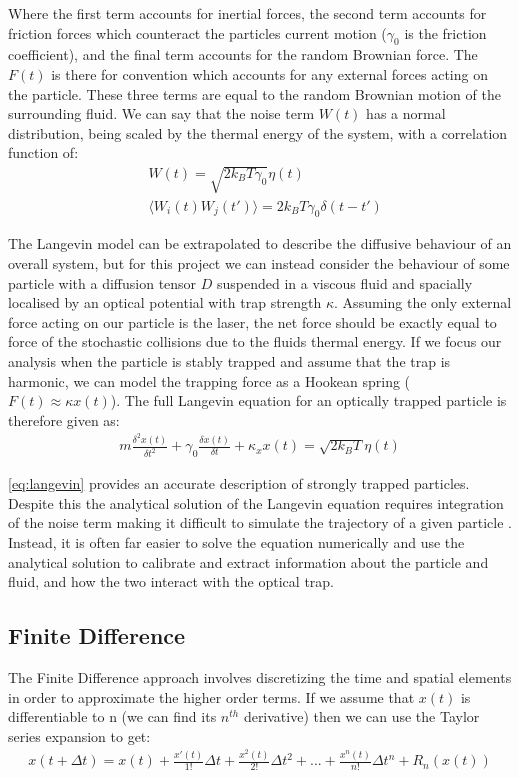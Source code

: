 Where the first term accounts for inertial forces, the second term 
accounts for friction forces which counteract the particles current 
motion ($\gamma_0$ is the friction coefficient), and the final term 
accounts for the random Brownian force. The $F(t)$ is there for 
convention which accounts for any external forces acting on the 
particle. These three terms are equal to the random Brownian motion 
of the surrounding fluid. We can say that the noise term $W(t)$ has 
a normal distribution, being scaled by the thermal energy of the 
system, with a correlation function of:
\begin{align}
	&W(t) = \sqrt{2k_BT\gamma_0}\eta(t) \\
	&\langle W_i(t)W_j(t')\rangle = 2k_BT\gamma_0\delta(t-t')
\end{align}

The Langevin model can be extrapolated to describe the diffusive behaviour 
of an overall system, but for this project we can instead consider the 
behaviour of some particle with a diffusion tensor $D$ suspended in a 
viscous fluid and spacially localised by an optical potential with trap 
strength $\kappa$. Assuming the only external force acting on our particle 
is the laser, the net force should be exactly equal to force of the stochastic
collisions due to the fluids thermal energy. If we focus our analysis when 
the particle is stably trapped and assume that the trap is harmonic, we can 
model the trapping force as a Hookean spring ($F(t) \approx \kappa x(t)$). 
The full Langevin equation for an optically trapped particle is therefore given as:
\begin{align}
	\label{eq:langevin}
	m\frac{\delta^2x(t)}{\delta t^2} + \gamma_0 \frac{\delta x(t)}{\delta t} + \kappa_x x(t) = \sqrt{2k_BT}\eta(t)
\end{align}

\eqref{eq:langevin} provides an accurate description of strongly trapped 
particles. Despite this the analytical solution of the Langevin equation requires 
integration of the noise term making it difficult to simulate the 
trajectory of a given particle \cite{Volpe2013}. Instead, it is often far 
easier to solve the equation numerically and use the analytical 
solution to calibrate and extract information about the particle and fluid, 
and how the two interact with the optical trap.

\subsection{Finite Difference}
The Finite Difference approach involves discretizing the time and spatial 
elements in order to approximate the higher order terms. If we assume that 
$x(t)$ is differentiable to n (we can find its $n^{th}$ derivative) then 
we can use the Taylor series expansion to get:
\begin{align}
	x(t+\Delta t) = x(t)+\frac{x'(t)}{1!}\Delta t + \frac{x^2(t)}{2!}\Delta t^2+...+\frac{x^n(t)}{n!}\Delta t^n+R_n(x(t))	
\end{align}

